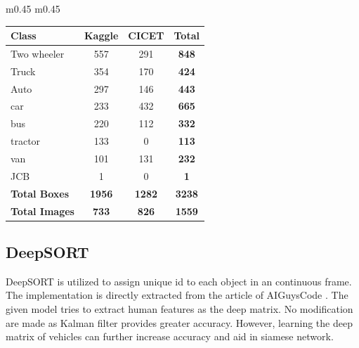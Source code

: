\begin{table}[!ht]
\begin{tabular}{m{0.45\linewidth} m{0.45\linewidth}}
		 \begin{tabular}{|l|c|c||c|}
		 	\hline
		 	\textbf{Class}        & \textbf{Kaggle} & \textbf{CICET} & \textbf{Total} \\ \hline
		 	Two wheeler           & 557             & 291            & \textbf{848}   \\ \hline
		 	Truck                 & 354             & 170            & \textbf{424}   \\ \hline
		 	Auto                  & 297             & 146            & \textbf{443}   \\ \hline
		 	car                   & 233             & 432            & \textbf{665}   \\ \hline
		 	bus                   & 220             & 112            & \textbf{332}   \\ \hline
		 	tractor               & 133             & 0              & \textbf{113}   \\ \hline
		 	van                   & 101             & 131            & \textbf{232}   \\ \hline
		 	JCB                   & 1               & 0              & \textbf{1}     \\ \hline \hline
		 	\textbf{Total Boxes}  & \textbf{1956}   & \textbf{1282}  & \textbf{3238}  \\ \hline
		 	\textbf{Total Images} & \textbf{733}    & \textbf{826}   & \textbf{1559}  \\ \hline
		 \end{tabular}
		 \label{tab:dataset_sum1}
	\end{tabular}
\end{table}

\subsection*{DeepSORT}
DeepSORT is utilized to assign unique id to each object in an continuous frame. The implementation is directly extracted from the article of AIGuysCode \cite{theaiguyscode_deepsort}. The given model tries to extract human features as the deep matrix. No modification are made as Kalman filter provides greater accuracy. However, learning the deep matrix of vehicles can further increase accuracy and aid in siamese network.

